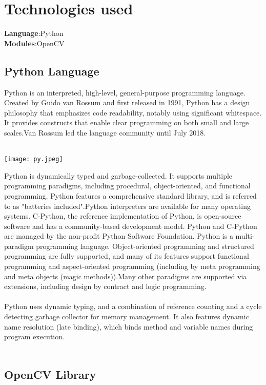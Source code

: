 \documentclass[12pt,a4paper]{report}
\begin{document}
\section{Technologies used}
\textbf{Language}:Python\\
\textbf{Modules}:OpenCV\\
\subsection{ Python Language}
Python is an interpreted, high-level, general-purpose programming language. Created by
Guido van Rossum and first released in 1991, Python has a design philosophy that emphasizes code readability, notably using significant whitespace. It provides constructs that
enable clear programming on both small and large scales.Van Rossum led the language
community until July 2018.\\\\
\begin{center}
\texttt{[image: py.jpeg]}
\begin{figure}[h!]
\caption{}
\end{figure}
\end{center}
Python is dynamically typed and garbage-collected. It supports multiple programming
paradigms, including procedural, object-oriented, and functional programming. Python
features a comprehensive standard library, and is referred to as "batteries included".Python
interpreters are available for many operating systems. C-Python, the reference implementation of Python, is open-source software and has a community-based development
model. Python and C-Python are managed by the non-profit Python Software Foundation. Python is a multi-paradigm programming language. Object-oriented programming
and structured programming are fully supported, and many of its features support functional programming and aspect-oriented programming (including by meta programming
and meta objects (magic methods)).Many other paradigms are supported via extensions,
including design by contract and logic programming.\\\\
Python uses dynamic typing, and a combination of reference counting and a cycle detecting garbage collector for memory management. It also features dynamic name
resolution (late binding), which binds method and variable names during program execution.\\ \\
\subsection{ OpenCV Library}\\ \\
\end{document}
